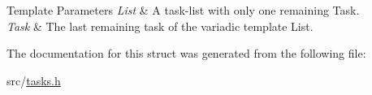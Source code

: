 \begin{DoxyTemplParams}{Template Parameters}
{\em List} & A task-\/list with only one remaining Task. \\
\hline
{\em Task} & The last remaining task of the variadic template List. \\
\hline
\end{DoxyTemplParams}


The documentation for this struct was generated from the following file\+:\begin{DoxyCompactItemize}
\item 
src/\hyperlink{tasks_8h}{tasks.\+h}\end{DoxyCompactItemize}
